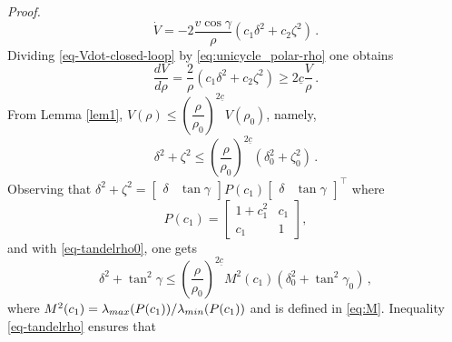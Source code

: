 \documentclass[10pt,a4paper]{amsart}
\renewenvironment{proof}[1][Proof]{\par\pushQED{\qed}\normalfont\textit{#1.}~}{\popQED\par}
\begin{document}
\begin{proof}
\begin{equation}
\label{eq-Vdot-closed-loop}
\dot V = -2 \frac{v\cos\gamma}{\rho}\left(
c_1\delta^2 +c_2\zeta^2\right)\,.
\end{equation}
Dividing \eqref{eq-Vdot-closed-loop} by \eqref{eq:unicycle_polar-rho} one obtains
\begin{equation}
\frac{dV}{d\rho} = \frac{2}{\rho}\left(
c_1\delta^2 +c_2\zeta^2\right) \geq 2\underline c \frac{V}{\rho}\,. \label{eq:dVdrho}
\end{equation}
From Lemma \ref{lem1}, $V(\rho) \leq \left(\dfrac{\rho}{\rho_0}\right)^{2\underline c} V(\rho_0)$, namely,
\begin{equation}
\label{eq-tandelrho0}
\delta^2+\zeta^2 \leq \left(\frac{\rho}{\rho_0}\right)^{2\underline c} \left(\delta^2_0+\zeta^2_0\right)\,.
\end{equation}
Observing that $\delta^2 + \zeta^2 = \begin{bmatrix}\delta &\tan \gamma\end{bmatrix} P(c_1)  \begin{bmatrix}\delta &\tan \gamma\end{bmatrix}^\top$ where
\begin{equation}
P(c_1) = \begin{bmatrix}
1+c_1^2 &c_1\\c_1 &1
\end{bmatrix},
\end{equation}
and with \eqref{eq-tandelrho0}, one gets  
\begin{equation}
\label{eq-tandelrho}
\delta^2+\tan^2\gamma \leq \left(\frac{\rho}{\rho_0}\right)^{2\underline c} M^2(c_1)\left(\delta^2_0+\tan^2\gamma_0\right)\,,
\end{equation}
where $M^2(c_1) = \lambda_{\rm max}(P(c_1))/\lambda_{\rm min}(P(c_1))$ and is defined in \eqref{eq:M}. Inequality \eqref{eq-tandelrho} ensures that 

\end{proof}
\end{document}
